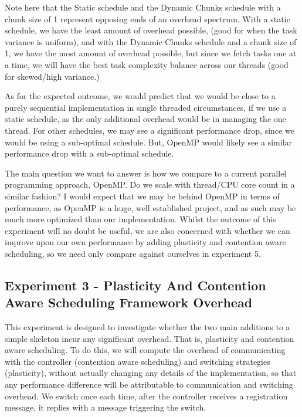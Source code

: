 Note here that the Static schedule and the Dynamic Chunks schedule with a chunk size of 1 represent opposing ends of an overhead spectrum. With a static schedule, we have the least amount of overhead possible, (good for when the task variance is uniform), and with the Dynamic Chunks schedule and a chunk size of 1, we have the most amount of overhead possible, but since we fetch tasks one at a time, we will have the best task complexity balance across our threads (good for skewed/high variance.)

As for the expected outcome, we would predict that we would be close to a purely sequential implementation in single threaded circumstances, if we use a static schedule, as the only additional overhead would be in managing the one thread. For other schedules, we may see a significant performance drop, since we would be using a sub-optimal schedule. But, OpenMP would likely see a similar performance drop with a sub-optimal schedule.

The main question we want to answer is how we compare to a current parallel programming approach, OpenMP. Do we scale with thread/CPU core count in a similar fashion? I would expect that we may be behind OpenMP in terms of performance, as OpenMP is a huge, well established project, and as such may be much more optimized than our implementation. Whilst the outcome of this experiment will no doubt be useful, we are also concerned with whether we can improve upon our own performance by adding plasticity and contention aware scheduling, so we need only compare against ourselves in experiment 5.





\subsection{Experiment 3 - Plasticity And Contention Aware Scheduling Framework Overhead}

This experiment is designed to investigate whether the two main additions to a simple skeleton incur any significant overhead. That is, plasticity and contention aware scheduling. To do this, we will compute the overhead of communicating with the controller (contention aware scheduling) and switching strategies (plasticity), without actually changing any details of the implementation, so that any performance difference will be attributable to communication and switching overhead. We switch once each time, after the controller receives a registration message, it replies with a message triggering the switch.

